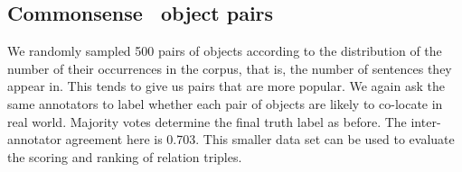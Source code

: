 \subsection{Commonsense \lnear~object pairs}
We randomly sampled 500 pairs of objects according to the distribution of
the number of their occurrences in the corpus, that is, the number of
sentences they appear in. This tends to give us pairs that are more popular.
We again ask the same annotators to label whether each pair of objects
are likely to co-locate in real world. Majority votes determine the final
truth label as before.
The inter-annotator agreement here is {0.703}. 
This smaller data set can be used to evaluate the 
scoring and ranking of relation triples.

